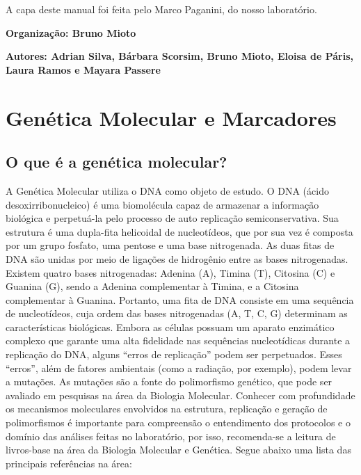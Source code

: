 \documentclass[
  letterpaper,
  DIV=11,
  numbers=noendperiod]{scrreprt}
\begin{document}
A capa deste manual foi feita pelo Marco Paganini, do nosso laboratório.

\textbf{Organização: Bruno Mioto}

\textbf{Autores: Adrian Silva, Bárbara Scorsim, Bruno Mioto, Eloisa de
Páris, Laura Ramos e Mayara Passere}


\hypertarget{genuxe9tica-molecular-e-marcadores}{%
\chapter{Genética Molecular e
Marcadores}\label{genuxe9tica-molecular-e-marcadores}}

\hypertarget{o-que-uxe9-a-genuxe9tica-molecular}{%
\section{O que é a genética
molecular?}\label{o-que-uxe9-a-genuxe9tica-molecular}}

A Genética Molecular utiliza o DNA como objeto de estudo. O DNA (ácido
desoxirribonucleico) é uma biomolécula capaz de armazenar a informação
biológica e perpetuá-la pelo processo de auto replicação
semiconservativa. Sua estrutura é uma dupla-fita helicoidal de
nucleotídeos, que por sua vez é composta por um grupo fosfato, uma
pentose e uma base nitrogenada. As duas fitas de DNA são unidas por meio
de ligações de hidrogênio entre as bases nitrogenadas. Existem quatro
bases nitrogenadas: Adenina (A), Timina (T), Citosina (C) e Guanina (G),
sendo a Adenina complementar à Timina, e a Citosina complementar à
Guanina. Portanto, uma fita de DNA consiste em uma sequência de
nucleotídeos, cuja ordem das bases nitrogenadas (A, T, C, G) determinam
as características biológicas. Embora as células possuam um aparato
enzimático complexo que garante uma alta fidelidade nas sequências
nucleotídicas durante a replicação do DNA, alguns ``erros de
replicação'' podem ser perpetuados. Esses ``erros'', além de fatores
ambientais (como a radiação, por exemplo), podem levar a mutações. As
mutações são a fonte do polimorfismo genético, que pode ser avaliado em
pesquisas na área da Biologia Molecular. Conhecer com profundidade os
mecanismos moleculares envolvidos na estrutura, replicação e geração de
polimorfismos é importante para compreensão o entendimento dos
protocolos e o domínio das análises feitas no laboratório, por isso,
recomenda-se a leitura de livros-base na área da Biologia Molecular e
Genética. Segue abaixo uma lista das principais referências na área:
\end{document}
